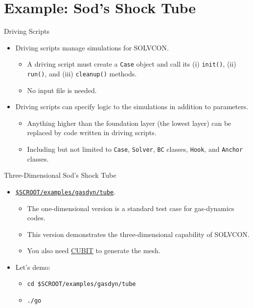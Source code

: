 \documentclass[dvips,xcolor=pst,14pt]{beamer}
\begin{document}
\section{
Example: Sod's Shock Tube
}

\begin{frame}{
%
Driving Scripts
%
}
\begin{itemize}
  \item Driving scripts manage simulations for SOLVCON.
  \begin{itemize}
    \item A driving script must create a \texttt{Case} object and call its (i)
    \texttt{init()}, (ii) \texttt{run()}, and (iii) \texttt{cleanup()} methods.
    \item No input file is needed.
  \end{itemize}
  \item Driving scripts can specify \alert{logic} to the simulations in addition to
  parameters.
  \begin{itemize}
    \item Anything higher than the foundation layer (the lowest layer) can be
    \alert{replaced} by code written in driving scripts.
    \item Including but not limited to \texttt{Case}, \texttt{Solver},
    \texttt{BC} classes, \texttt{Hook}, and \texttt{Anchor} classes.
  \end{itemize}
\end{itemize}
\end{frame}

\begin{frame}[fragile]{
%
Three-Dimensional Sod's Shock Tube
%
}
\begin{itemize}
  \item
  \href{https://bitbucket.org/solvcon/solvcon/src/09bcbc949751/examples/gasdyn/tube}{\texttt{\$SCROOT/examples/gasdyn/tube}}.
  \begin{itemize}
    \item The one-dimensional version is a standard test case for gas-dynamics
    codes.
    \item This version demonstrates the three-dimensional capability of
    SOLVCON.
    \item You also need \href{http://cubit.sandia.gov/}{CUBIT} to generate the
    mesh.
  \end{itemize}
  \item Let's demo:
  \begin{itemize}
    \item \verb+cd $SCROOT/examples/gasdyn/tube+
    \item \verb+./go+
  \end{itemize}
\end{itemize}
\end{frame}
\end{document}
